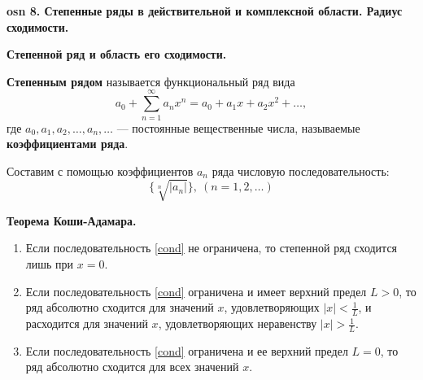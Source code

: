 \setcounter{section}{15}
\setcounter{subsection}{8}
\setcounter{equation}{0}
\textbf{\LARGE osn 8. Степенные ряды в действительной и комплексной области. Радиус сходимости.}

\textbf{Степенной ряд и область его сходимости.}

\textbf{Степенным рядом} называется функциональный ряд вида
$$ a_0 + \displaystyle\sum_{n=1}^{\infty}a_n x^n =a_0 +a_1 x+a_2 x^2 +\dots,$$
где $a_0, a_1, a_2,\dots, a_n,\dots$ --- постоянные вещественные числа, называемые \textbf{коэффициентами ряда}.

Составим с помощью коэффициентов $a_n$ ряда числовую последовательность:
\begin{equation}
    \{\sqrt[n]{|a_n|}\},~(n = 1,2,\dots)
    \label{cond}
\end{equation}

\textbf{Теорема Коши-Адамара.}
\begin{enumerate}
    \item Если последовательность \eqref{cond} не ограничена, то степенной ряд сходится лишь при $x = 0$.
    \item Если последовательность \eqref{cond} ограничена и имеет верхний предел $L > 0$, то ряд абсолютно сходится для значений $x$, удовлетворяющих $|x| < \frac{1}{L}$, и расходится для значений $x$, удовлетворяющих неравенству $|x| > \frac{1}{L}$.
    \item Если последовательность \eqref{cond} ограничена и ее верхний предел $L = 0$, то ряд абсолютно сходится для всех значений $x$.
\end{enumerate}

